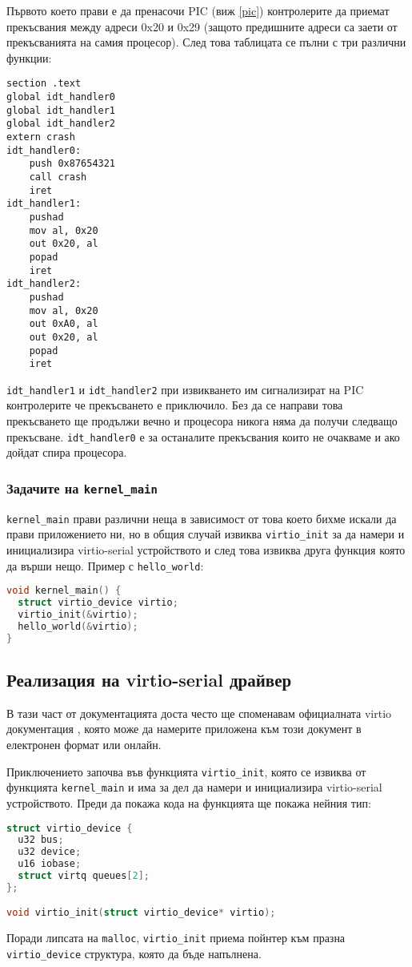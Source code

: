 Първото което прави е да пренасочи PIC (виж \ref{pic}) контролерите да приемат прекъсвания между адреси 0x20 и 0x29 (защото предишните адреси са заети от прекъсванията на самия процесор). След това таблицата се пълни с три различни функции:
\begin{lstlisting}
section .text
global idt_handler0
global idt_handler1
global idt_handler2
extern crash
idt_handler0:
    push 0x87654321
    call crash
    iret
idt_handler1:
    pushad
    mov al, 0x20
    out 0x20, al
    popad
    iret
idt_handler2:
    pushad
    mov al, 0x20
    out 0xA0, al
    out 0x20, al
    popad
    iret
\end{lstlisting}
{\tt idt\_handler1} и {\tt idt\_handler2} при извикването им сигнализират на PIC контролерите че прекъсването е приключило. Без да се направи това прекъсването ще продължи вечно и процесора никога няма да получи следващо прекъсване. {\tt idt\_handler0} е за останалите прекъсвания които не очакваме и ако дойдат спира процесора.

\subsubsection{Задачите на {\tt kernel\_main}}
{\tt kernel\_main} прави различни неща в зависимост от това което бихме искали да прави приложението ни, но в общия случай извиква {\tt virtio\_init} за да намери и инициализира virtio-serial устройството и след това извиква друга функция която да върши нещо. Пример с {\tt hello\_world}:
\begin{lstlisting}[language=C]
void kernel_main() {
  struct virtio_device virtio;
  virtio_init(&virtio);
  hello_world(&virtio);
}
\end{lstlisting}

\subsection{Реализация на virtio-serial драйвер}
В тази част от документацията доста често ще споменавам официалната virtio документация \parencite{virtiodocs}, която може да намерите приложена към този документ в електронен формат или онлайн.

Приключението започва във функцията {\tt virtio\_init}, която се извиква от функцията {\tt kernel\_main} и има за дел да намери и инициализира virtio-serial устройството. Преди да покажа кода на функцията ще покажа нейния тип:
\begin{lstlisting}[language=C]
struct virtio_device {
  u32 bus;
  u32 device;
  u16 iobase;
  struct virtq queues[2];
};

void virtio_init(struct virtio_device* virtio);
\end{lstlisting}
Поради липсата на {\tt malloc}, {\tt virtio\_init} приема пойнтер към празна {\tt virtio\_device} структура, която да бъде напълнена.

